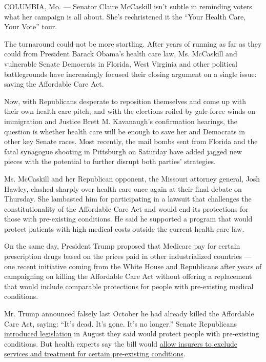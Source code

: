 COLUMBIA, Mo. --- Senator Claire McCaskill isn't subtle in reminding
voters what her campaign is all about. She's rechristened it the ``Your
Health Care, Your Vote'' tour.

The turnaround could not be more startling. After years of running as
far as they could from President Barack Obama's health care law, Ms.
McCaskill and vulnerable Senate Democrats in Florida, West Virginia and
other political battlegrounds have increasingly focused their closing
argument on a single issue: saving the Affordable Care Act.

Now, with Republicans desperate to reposition themselves and come up
with their own health care pitch, and with the elections roiled by
gale-force winds on immigration and Justice Brett M. Kavanaugh's
confirmation hearings, the question is whether health care will be
enough to save her and Democrats in other key Senate races. Most
recently, the mail bombs sent from Florida and the fatal synagogue
shooting in Pittsburgh on Saturday have added jagged new pieces with the
potential to further disrupt both parties' strategies.

Ms. McCaskill and her Republican opponent, the Missouri attorney
general, Josh Hawley, clashed sharply over health care once again at
their final debate on Thursday. She lambasted him for participating in a
lawsuit that challenges the constitutionality of the Affordable Care Act
and would end its protections for those with pre-existing conditions. He
said he supported a program that would protect patients with high
medical costs outside the current health care law.

On the same day, President Trump proposed that Medicare pay for certain
prescription drugs based on the prices paid in other industrialized
countries --- one recent initiative coming from the White House and
Republicans after years of campaigning on killing the Affordable Care
Act without offering a replacement that would include comparable
protections for people with pre-existing medical conditions.

Mr. Trump announced falsely last October he had already killed the
Affordable Care Act, saying: ``It's dead. It's gone. It's no longer.''
Senate Republicans
\href{https://www.tillis.senate.gov/public/index.cfm/2018/8/senators-introduce-legislation-to-protect-americans-with-pre-existing-conditions}{introduced
legislation} in August they said would protect people with pre-existing
conditions. But health experts say the bill would
\href{https://twitter.com/larry_levitt/status/1033020087437996033}{allow
insurers to exclude services and treatment for certain pre-existing
conditions}.

